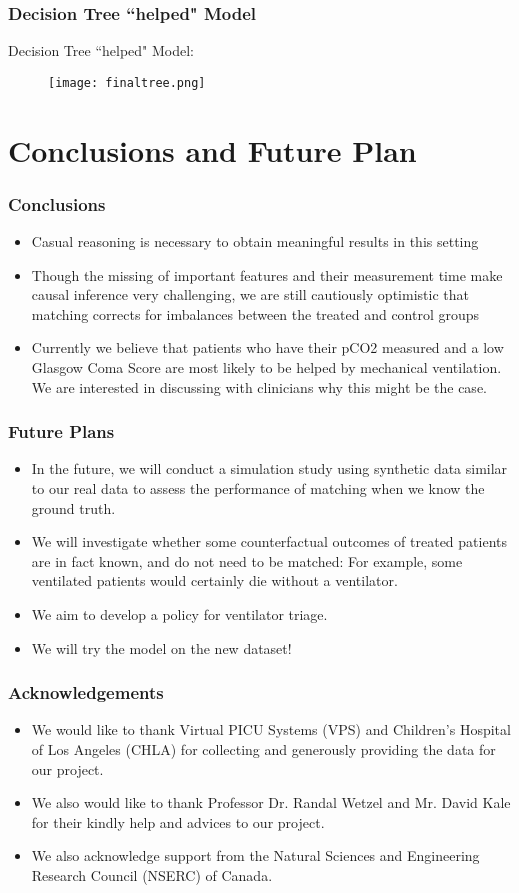 \documentclass{beamer}
\begin{document}
\begin{frame}
\frametitle{Decision Tree ``helped" Model}
Decision Tree ``helped" Model:
\begin{figure}
\texttt{[image: finaltree.png]}
\end{figure}
\end{frame}
\section{Conclusions and Future Plan}
\begin{frame}
\frametitle{Conclusions}
\begin{itemize}
\item Casual reasoning is necessary to obtain meaningful results in this setting
\item Though the missing of important features and their measurement time make causal inference very challenging, we are still cautiously optimistic that matching corrects for imbalances between the treated and control groups
\item Currently we believe that patients who have their pCO2 measured and a
low Glasgow Coma Score are most likely to be helped by mechanical ventilation. We are interested in discussing with clinicians why this might be the case.
\end{itemize}
\end{frame}
\begin{frame}
\frametitle{Future Plans}
\begin{itemize}
\item In the future, we will conduct a simulation study using synthetic data similar to our real data to assess the performance of matching when we know the ground truth.
\item We will investigate whether some counterfactual outcomes of treated patients are in fact known, and do not need to be matched: For example, some ventilated patients would certainly die without a ventilator.
\item We aim to develop a policy for ventilator triage.
\pause
\item We will try the model on the new dataset!
\end{itemize}
\end{frame}
\begin{frame}
\frametitle{Acknowledgements}
\begin{itemize}
\item We would like to thank Virtual PICU Systems (VPS) and Children's Hospital of Los Angeles (CHLA) for collecting and generously providing the data for our project. 
\item We also would like to thank Professor Dr. Randal Wetzel and Mr. David Kale for their kindly help and advices to our project. 
\item We also acknowledge support from the Natural Sciences and Engineering Research Council (NSERC) of Canada.
\end{itemize}
\end{frame}
\end{document}
